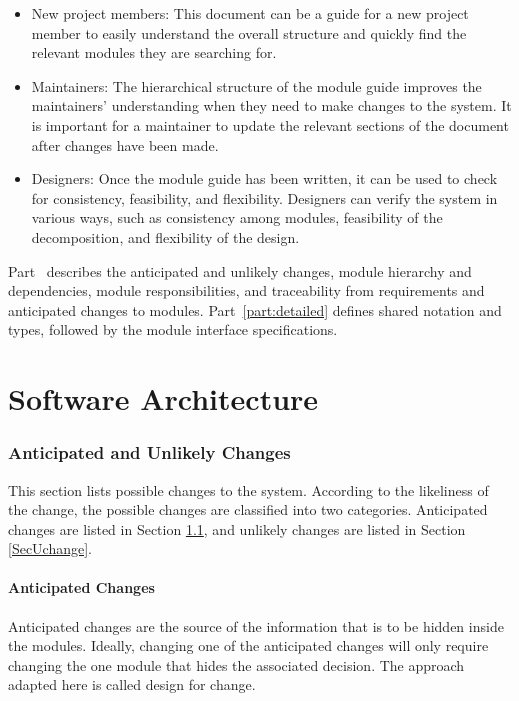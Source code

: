 \documentclass[12pt, titlepage]{article}
\begin{document}
\begin{itemize}
\item New project members: This document can be a guide for a new project member
  to easily understand the overall structure and quickly find the
  relevant modules they are searching for.
\item Maintainers: The hierarchical structure of the module guide improves the
  maintainers' understanding when they need to make changes to the system. It is
  important for a maintainer to update the relevant sections of the document
  after changes have been made.
\item Designers: Once the module guide has been written, it can be used to
  check for consistency, feasibility, and flexibility. Designers can verify the
  system in various ways, such as consistency among modules, feasibility of the
  decomposition, and flexibility of the design.
\end{itemize}

Part~\ref{part:architecture} describes the anticipated and unlikely changes,
module hierarchy and dependencies, module responsibilities, and traceability
from requirements and anticipated changes to modules.
Part~\ref{part:detailed} defines shared notation and types, followed by the
module interface specifications.

\clearpage

\part{Software Architecture} \label{part:architecture}

\section{Anticipated and Unlikely Changes} \label{SecChange}

This section lists possible changes to the system. According to the likeliness
of the change, the possible changes are classified into two
categories. Anticipated changes are listed in Section \ref{SecAchange}, and
unlikely changes are listed in Section \ref{SecUchange}.

\subsection{Anticipated Changes} \label{SecAchange}

Anticipated changes are the source of the information that is to be hidden
inside the modules. Ideally, changing one of the anticipated changes will only
require changing the one module that hides the associated decision. The approach
adapted here is called design for
change.
\end{document}
